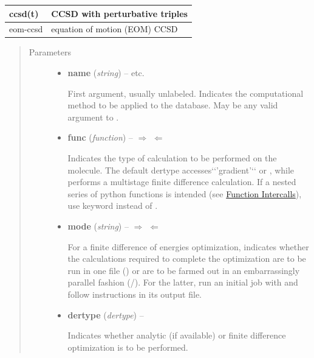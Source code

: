 \documentclass[letterpaper,10pt,english]{sphinxmanual}
\begin{document}
\begin{fulllineitems}
\begin{tabulary}{\linewidth}{|L|L|}
ccsd(t)
 & 
CCSD with perturbative triples
\\\hline

eom-ccsd
 & 
equation of motion (EOM) CCSD
\\\hline
\end{tabulary}

\begin{quote}\begin{description}
\item[{Parameters}] \leavevmode\begin{itemize}
\item {} 
\textbf{name} (\emph{string}) -- 
 \textbar{}\textbar{}  \textbar{}\textbar{}  \textbar{}\textbar{} etc.

First argument, usually unlabeled. Indicates the computational method
to be applied to the database. May be any valid argument to
{\hyperref[index:driver.energy]{}}.


\item {} 
\textbf{func} (\emph{function}) -- 
$\Rightarrow$  $\Leftarrow$ \textbar{}\textbar{}  \textbar{}\textbar{} 

Indicates the type of calculation to be performed on the molecule.
The default dertype accesses{}`{}`'gradient'{}`{}` or , while
 performs a multistage finite difference calculation.
If a nested series of python functions is intended (see {\hyperref[index:function-intercalls]{Function Intercalls}}),
use keyword  instead of .


\item {} 
\textbf{mode} (\emph{string}) -- 
$\Rightarrow$  $\Leftarrow$ \textbar{}\textbar{}  \textbar{}\textbar{} 

For a finite difference of energies optimization, indicates whether
the calculations required to complete the
optimization are to be run in one file () or are to be
farmed out in an embarrassingly parallel fashion
(/).  For the latter, run an initial job with
 and follow instructions in its output file.


\item {} 
\textbf{dertype} (\emph{dertype}) -- 
 \textbar{}\textbar{} 

Indicates whether analytic (if available) or finite difference
optimization is to be performed.



\end{itemize}
\end{description}
\end{quote}
\end{fulllineitems}
\end{document}
